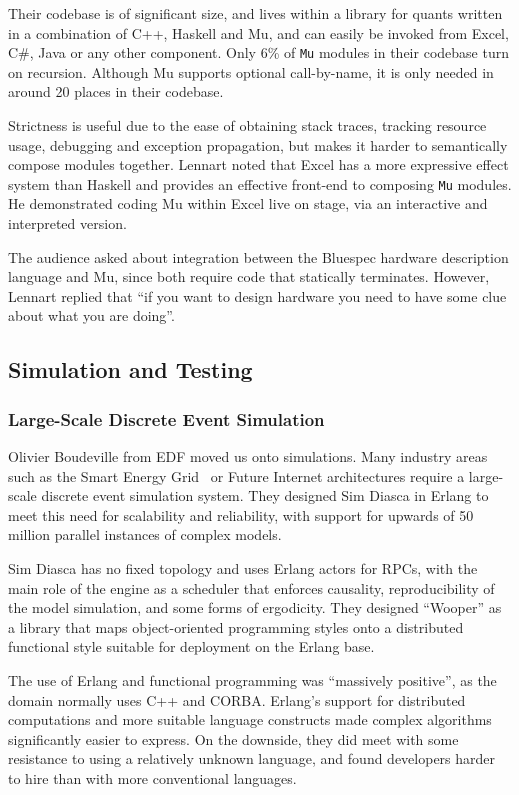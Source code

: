 \documentclass{jfp1}
\begin{document}
Their codebase is of significant size, and lives within a library for quants
written in a combination of C++, Haskell and Mu, and can easily be invoked from
Excel, C\#, Java or any other component. Only 6\% of {\tt Mu} modules in their
codebase turn on recursion. Although Mu supports optional call-by-name, it is
only needed in around 20 places in their codebase.

Strictness is useful due to the ease of obtaining stack traces, tracking
resource usage, debugging and exception propagation, but makes it harder to
semantically compose modules together.  Lennart noted that Excel has a more
expressive effect system than Haskell and provides an effective front-end to
composing {\tt Mu} modules. He demonstrated coding Mu within Excel live on stage,
via an interactive and interpreted version.

The audience asked about integration between the Bluespec hardware description
language and Mu, since both require code that statically terminates. However,
Lennart replied that ``if you want to design hardware you need to have some
clue about what you are doing''.

\subsection{Simulation and Testing}

\subsubsection{Large-Scale Discrete Event Simulation}

Olivier Boudeville from EDF moved us onto simulations. Many industry areas such
as the Smart Energy Grid~\cite{x} or Future Internet architectures require a
large-scale discrete event simulation system. They designed Sim Diasca in
Erlang to meet this need for scalability and reliability, with support for
upwards of 50 million parallel instances of complex models.

Sim Diasca has no fixed topology and uses Erlang actors for RPCs, with the main
role of the engine as a scheduler that enforces causality, reproducibility of
the model simulation, and some forms of ergodicity. They designed ``Wooper'' as
a library that maps object-oriented programming styles onto a distributed
functional style suitable for deployment on the Erlang base.

The use of Erlang and functional programming was ``massively positive'', as the
domain normally uses C++ and CORBA.  Erlang's support for distributed
computations and more suitable language constructs made complex algorithms
significantly easier to express.  On the downside, they did meet with some
resistance to using a relatively unknown language, and found developers harder
to hire than with more conventional languages.
\end{document}
